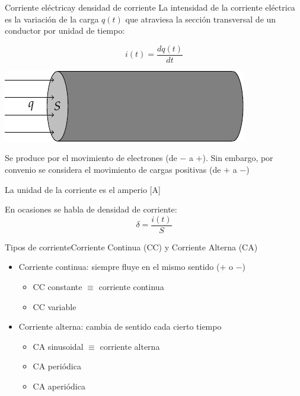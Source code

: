 \documentclass[aspectratio=169, xcolor={usenames,svgnames,dvipsnames}]{beamer}
\begin{document}
\begin{frame}{Corriente eléctrica}{y densidad de corriente}
La \alert{intensidad de la corriente eléctrica} es la variación de la carga \(q(t)\) que atraviesa la sección transversal de un conductor por unidad de tiempo:
\begin{minipage}[c]{0.48\linewidth}
\begin{equation*}
  i(t)=\frac{dq(t)}{dt}
\end{equation*}
\end{minipage}
\hfill
\begin{minipage}[c]{0.48\linewidth}
\begin{center}
\includegraphics[width=0.8\linewidth]{../figs/seccion_conductor.pdf}
\end{center}
\end{minipage}

Se produce por el \alert{movimiento de electrones} (de $-$ a $+$). Sin embargo, por convenio se considera el \alert{movimiento de cargas positivas} (de $+$ a $-$)

La \alert{unidad} de la corriente es el \alert{amperio} [A]

En ocasiones se habla de \alert{densidad de corriente}:
\begin{equation*}
    \delta=\dfrac{i(t)}{S}
\end{equation*}
\end{frame}

\begin{frame}{Tipos de corriente}{Corriente Continua (CC) y Corriente Alterna (CA)}
\begin{itemize}
\item Corriente continua: siempre fluye en el mismo sentido ($+$ o $-$)
\begin{itemize}
    \item \alert{CC constante} $\equiv$ corriente continua
    \item CC variable
\end{itemize}
\item Corriente alterna: cambia de sentido cada cierto tiempo
\begin{itemize}
    \item \alert{CA sinusoidal} $\equiv$ corriente alterna
    \item CA periódica
    \item CA aperiódica
\end{itemize}
\end{itemize}
\end{frame}
\end{document}
